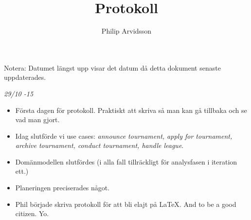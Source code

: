 \documentclass{article}
\title{Protokoll}
\author{Philip Arvidsson}
\begin{document}
    \maketitle

    Notera: Datumet längst upp visar det datum då detta dokument senaste
            uppdaterades.

    \vspace{1.5cm}

    {\large \textit{29/10 -15}}
    \begin{itemize}
      \item Första dagen för protokoll. Praktiskt att skriva så man kan
            gå tillbaka och se vad man gjort.

      \item Idag slutförde vi use cases: \textit{announce tournament,
            apply for tournament, archive tournament, conduct
            tournament, handle league}.

      \item Domänmodellen slutfördes (i alla fall tillräckligt för
            analysfasen i iteration ett.)

      \item Planeringen preciserades något.

      \item Phil började skriva protokoll för att bli elajt på LaTeX.
            And to be a good citizen. Yo.
  \end{itemize}
\end{document}

